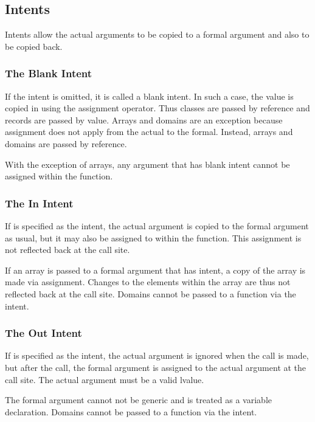 \subsection{Intents}
\label{Intents}

Intents allow the actual arguments to be copied to a formal argument
and also to be copied back.

\subsubsection{The Blank Intent}
\label{The_Blank_Intent}

If the intent is omitted, it is called a blank intent.  In such a
case, the value is copied in using the assignment operator.  Thus
classes are passed by reference and records are passed by value.
Arrays and domains are an exception because assignment does not apply
from the actual to the formal.  Instead, arrays and domains are passed
by reference.

With the exception of arrays, any argument that has blank intent
cannot be assigned within the function.

\subsubsection{The In Intent}
\label{The_In_Intent}

If  is specified as the intent, the actual argument is copied
to the formal argument as usual, but it may also be assigned to within
the function.  This assignment is not reflected back at the call site.

If an array is passed to a formal argument that has  intent,
a copy of the array is made via assignment.  Changes to the elements
within the array are thus not reflected back at the call site.
Domains cannot be passed to a function via the  intent.

\subsubsection{The Out Intent}
\label{The_Out_Intent}

If  is specified as the intent, the actual argument is
ignored when the call is made, but after the call, the formal argument
is assigned to the actual argument at the call site.  The actual
argument must be a valid lvalue.

The formal argument cannot not be generic and is treated as a variable
declaration.  Domains cannot be passed to a function via
the  intent.


